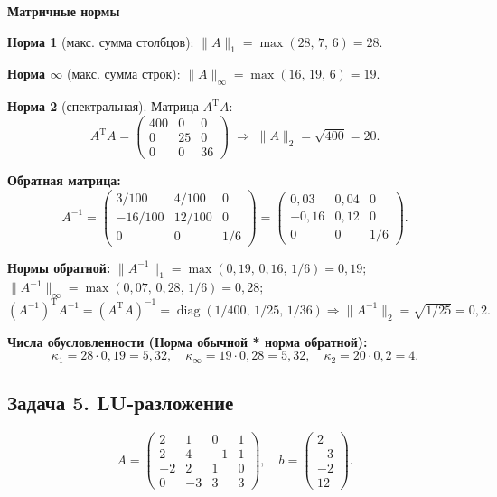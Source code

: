 \documentclass{article}
\begin{document}
\textbf{Матричные нормы}

\textbf{Норма 1} (макс. сумма столбцов):
$\|A\|_1 = \max(28,\, 7,\, 6) = 28.$

\textbf{Норма $\infty$} (макс. сумма строк):
$\|A\|_\infty = \max(16,\, 19,\, 6) = 19.$

\textbf{Норма 2} (спектральная). Матрица $A^\text{T}A$:
$$A^\text{T}A = \begin{pmatrix} 400 & 0 & 0 \\ 0 & 25 & 0 \\ 0 & 0 & 36 \end{pmatrix} \;\Rightarrow\; \|A\|_2 = \sqrt{400} = 20.$$

\textbf{Обратная матрица:}
$$A^{-1} = \begin{pmatrix} 3/100 & 4/100 & 0 \\ -16/100 & 12/100 & 0 \\ 0 & 0 & 1/6 \end{pmatrix} = \begin{pmatrix} 0{,}03 & 0{,}04 & 0 \\ -0{,}16 & 0{,}12 & 0 \\ 0 & 0 & 1/6 \end{pmatrix}.$$

\textbf{Нормы обратной:}
$\|A^{-1}\|_1 = \max(0{,}19,\, 0{,}16,\, 1/6) = 0{,}19;$
$\|A^{-1}\|_\infty = \max(0{,}07,\, 0{,}28,\, 1/6) = 0{,}28;$
$(A^{-1})^\text{T}A^{-1} = (A^\text{T}A)^{-1} = \operatorname{diag}(1/400,\, 1/25,\, 1/36) \Rightarrow \|A^{-1}\|_2 = \sqrt{1/25} = 0{,}2.$

\textbf{Числа обусловленности (Норма обычной * норма обратной):}
$$\boxed{\kappa_1 = 28\cdot 0{,}19 = 5{,}32, \quad \kappa_\infty = 19\cdot 0{,}28 = 5{,}32, \quad \kappa_2 = 20\cdot 0{,}2 = 4.}$$


\subsection*{Задача 5. LU-разложение}
$$A = \begin{pmatrix} 2 & 1 & 0 & 1 \\ 2 & 4 & -1 & 1 \\ -2 & 2 & 1 & 0 \\ 0 & -3 & 3 & 3 \end{pmatrix}, \quad b = \begin{pmatrix} 2 \\ -3 \\ -2 \\ 12 \end{pmatrix}.$$
\end{document}
